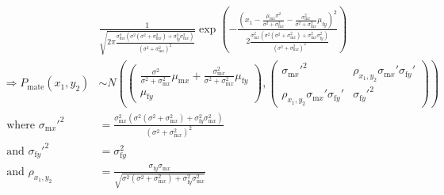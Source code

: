 \documentclass{article}
\newcommand{\x}[1]{\text{#1}}
\begin{document}
\begin{landscape}
{\begin{align*}
\\&\frac{1}{\sqrt{2\pi\frac{\sigma_{\x{m}x}^2(\sigma^2(\sigma^2+\sigma_{\x{m}x}^2)+\sigma_{\x{f}y}^2\sigma_{\x{m}x}^2)}{(\sigma^2+\sigma_{\x{m}x}^2)^2}}}\exp\left(-\frac{\left(x_1-\frac{\mu_{\x{m}x}\sigma^2}{\sigma^2+\sigma_{\x{m}x}^2}-\frac{\sigma_{\x{m}x}^2}{\sigma^2+\sigma_{\x{m}x}^2}\mu_{\x{f}y}\right)^2}{2\frac{\sigma_{\x{m}x}^2(\sigma^2(\sigma^2+\sigma_{\x{m}x}^2)+\sigma_{\x{m}x}^2\sigma_{\x{f}y}^2)}{(\sigma^2+\sigma_{\x{m}x}^2)^2}}\right)
\\ \Rightarrow P_\text{mate}(x_1,y_2)&\sim N\left(\left(\begin{array}{cc}\frac{\sigma^2}{\sigma^2+\sigma_{\x{m}x}^2}\mu_{\x{m}x}+\frac{\sigma_{\x{m}x}^2}{\sigma^2+\sigma_{\x{m}x}^2}\mu_{\x{f}y} \\ \mu_{\x{f}y} \end{array}\right),\left(\begin{array}{cc} \sigma_{\x{m}x}'^2 & \rho_{x_1,y_2}\sigma_{\x{m}x}'\sigma_{\x{f}y}' \\ \rho_{x_1,y_2}\sigma_{\x{m}x}'\sigma_{\x{f}y}' & \sigma_{\x{f}y}'^2  \end{array}\right)\right)
\\ \text{ where } \sigma_{\x{m}x}'^2&=\frac{\sigma_{\x{m}x}^2(\sigma^2(\sigma^2+\sigma_{\x{m}x}^2)+\sigma_{\x{f}y}^2\sigma_{\x{m}x}^2)}{(\sigma^2+\sigma_{\x{m}x}^2)^2}
\\ \text{ and } \sigma_{\x{f}y}'^2&=\sigma_{\x{f}y}^2
\\ \text{ and } \rho_{x_1,y_2}&=\frac{\sigma_{\x{f}y}\sigma_{\x{m}x}}{\sqrt{\sigma^2(\sigma^2+\sigma_{\x{m}x}^2)+\sigma_{\x{f}y}^2\sigma_{\x{m}x}^2}}
\end{align*}
}


\end{landscape}
\end{document}
